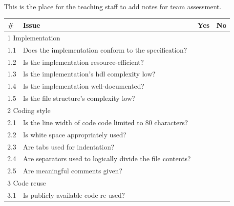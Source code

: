 \documentclass[%
	a4paper,
]
{article}
\begin{document}
This is the place for the teaching staff to add notes for team assessment.

\begin{table}[h!]
	\centering
	\renewcommand{\arraystretch}{2}
	\begin{tabular}{
		|p{.025\linewidth}
		|p{.75\linewidth}
		|p{.05\linewidth}
		|p{.05\linewidth}|
	}

		\hline
		\textbf{\#} & \textbf{Issue} & \textbf{Yes} & \textbf{No} \\
		\hline

		\multicolumn{4}{|p{.95\linewidth}|}{\cellcolor{gray!20} 1 Implementation}
			\\\hline

		1.1 & Does the implementation conform to the specification? & & \\\hline

		1.2 & Is the implementation resource-efficient? & & \\\hline

		1.3 & Is the implementation's \gls{hdl} complexity low? & & \\\hline

		1.4 & Is the implementation well-documented? & & \\\hline

		1.5 & Is the file structure's complexity low? & & \\\hline

		\multicolumn{4}{|p{.95\linewidth}|}{\cellcolor{gray!20} 2 Coding style}
			\\\hline

		2.1 & Is the line width of code code limited to 80 characters?
			& & \\\hline

		2.2 & Is white space appropriately used? & & \\\hline

		2.3 & Are tabs used for indentation? & & \\\hline

		2.4 & Are separators used to logically divide the file contents? & & \\\hline

		2.5 & Are meaningful comments given? & & \\\hline

		\multicolumn{4}{|p{.95\linewidth}|}{\cellcolor{gray!20} 3 Code reuse} \\\hline

		3.1 & Is publicly available code re-used? & & \\\hline


\end{tabular}
\end{table}
\end{document}
